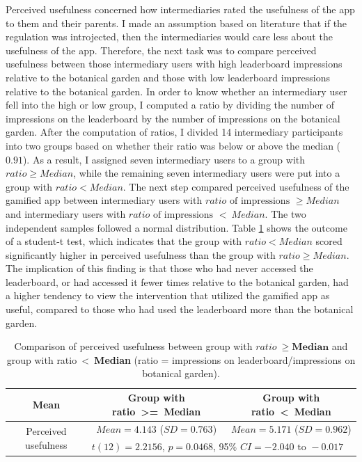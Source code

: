 Perceived usefulness concerned how intermediaries rated the usefulness of the app to them and their parents. I made an assumption based on literature that if the regulation was introjected, then the intermediaries would care less about the usefulness of the app. Therefore, the next task was to compare perceived usefulness between those intermediary users with high leaderboard impressions relative to the botanical garden and those with low leaderboard impressions relative to the botanical garden. In order to know whether an intermediary user fell into the high or low group, I computed a ratio by dividing the number of impressions on the leaderboard by the number of impressions on the botanical garden. After the computation of ratios, I divided 14 intermediary participants into two groups based on whether their ratio was below or above the median ($0.91$). As a result, I assigned seven intermediary users to a group with $ratio\geq Median$, while the remaining seven intermediary users were put into a group with $ratio<Median$. The next step compared perceived usefulness of the gamified app between intermediary users with $ratio \text{ of impressions }\geq Median$ and intermediary users with $ratio \text{ of  impressions }<~Median$. The two independent samples followed a normal distribution. Table \ref{table:pu_leaderboard_bias} shows the outcome  of a student-t test, which indicates that the group with $ratio<Median$ scored significantly higher in perceived usefulness than the group with $ratio\geq Median$. The implication of this finding is that those who had never accessed the leaderboard, or had accessed it fewer times relative to the botanical garden, had a higher tendency to view the intervention that utilized the gamified app as useful, compared to those who had used the leaderboard more than the botanical garden. 

\begin{table}[h!]
  \begin{center}
    \caption{Comparison of perceived usefulness between group with $ratio~\geq\textbf{Median}$ and group with ratio~\textless~\textbf{Median} (ratio = impressions on leaderboard/impressions on botanical garden).}
    \label{table:pu_leaderboard_bias}
	\begin{tabular}{|c|c|c|}
		\hline
		Mean &Group with ratio~\textgreater=~\textbf{Median}&Group with ratio~\textless~\textbf{Median}\\
		\hline
		 \multirow{2}{*}{Perceived usefulness}&$Mean=4.143$ ($SD = 0.763$)&$Mean=5.171$ ($SD = 0.962$)\\\cline{2-3} 

		 &\multicolumn{2}{|l|}{$t(12)=2.2156$, $p=0.0468$, 95\% $CI = -2.040 \text{ to }  -0.017$} \\
\hline
	\end{tabular}
  \end{center}
\end{table}

